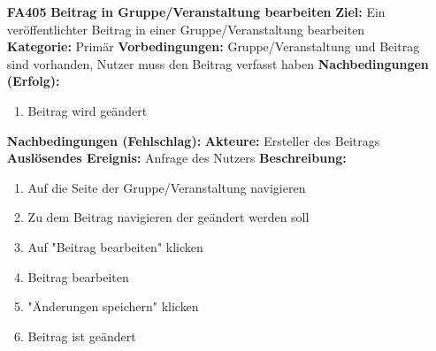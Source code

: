\documentclass[parskip=full]{scrartcl}
\begin{document}
\begin{itemize}[nosep]
			\item[\textbf{FA405}]\textbf{Beitrag in Gruppe/Veranstaltung bearbeiten}
			\newline \textbf{Ziel:} Ein veröffentlichter Beitrag in einer Gruppe/Veranstaltung bearbeiten
			\newline \textbf{Kategorie:} Primär
			\newline \textbf{Vorbedingungen:} Gruppe/Veranstaltung und Beitrag sind vorhanden, Nutzer muss den Beitrag verfasst haben
			\newline \textbf{Nachbedingungen (Erfolg):}
			\begin{enumerate}[nosep]
				\item Beitrag wird geändert
			\end{enumerate}
			\textbf{Nachbedingungen (Fehlschlag):}
			\newline \textbf{Akteure:} Ersteller des Beitrags
			\newline \textbf{Auslösendes Ereignis:} Anfrage des Nutzers
			\newline \textbf{Beschreibung:}
			\begin{enumerate}[nosep]
				\item Auf die Seite der Gruppe/Veranstaltung navigieren
				\item Zu dem Beitrag navigieren der geändert werden soll
				\item Auf "Beitrag bearbeiten" klicken
				\item Beitrag bearbeiten
				\item "Änderungen speichern" klicken
				\item Beitrag ist geändert\\
			\end{enumerate}
			

\end{itemize}
\end{document}
